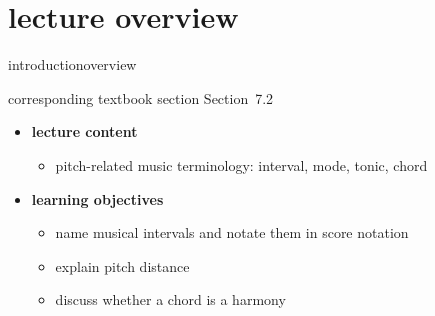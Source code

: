 


\subtitle{Module 7.2: Representation of Pitch in Music}


	

    \section[overview]{lecture overview}
        \begin{frame}{introduction}{overview}
            \begin{block}{corresponding textbook section}
                    Section~7.2
            \end{block}

            \begin{itemize}
                \item   \textbf{lecture content}
                    \begin{itemize}
                        \item   pitch-related music terminology: interval, mode, tonic, chord
                    \end{itemize}
                \bigskip
                \item<2->   \textbf{learning objectives}
                    \begin{itemize}
                        \item   name musical intervals and notate them in score notation
                        \item   explain pitch distance
                        \item   discuss whether a chord is a harmony
                    \end{itemize}
            \end{itemize}
        \end{frame}

